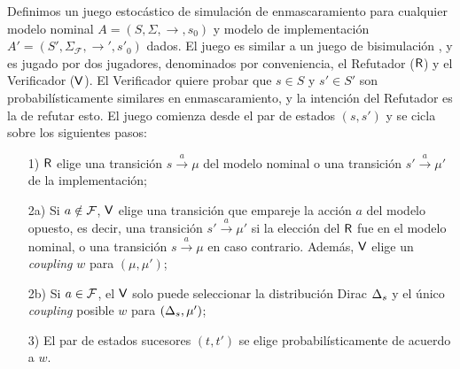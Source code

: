 Definimos un juego estocástico de simulación de enmascaramiento para cualquier modelo nominal
$A = ( S, \Sigma, {\rightarrow}, s_0 )$ y modelo de implementación $A' = ( S', \Sigma_{\mathcal{F}}, {\rightarrow'}, s'_0 )$ dados. 
El juego es similar a un juego de bisimulación \cite{Stirling98}, y es jugado por dos jugadores, 
denominados por conveniencia, el Refutador ($\mathsf{R}$) y el Verificador ($\mathsf{V}$). El Verificador quiere probar que $s \in S$ y $s' \in S'$ son probabilísticamente similares en enmascaramiento, 
y la intención del Refutador es la de refutar esto.
El juego comienza desde el par de estados $(s,s')$ y se cicla sobre los siguientes pasos:
\begin{enumerate}
\item[1)]
  $\mathsf{R}$ elige una transición $s \xrightarrow{a} \mu$ del modelo nominal o una transición $s' \xrightarrow{a} \mu'$ de la implementación;
\item[2a)]
  Si $a \notin \mathcal{F}$, $\mathsf{V}$ elige una transición que empareje la acción $a$ del modelo opuesto, es decir, una transición $s'
  \xrightarrow{a} \mu'$ si la elección del $\mathsf{R}$ fue en el modelo nominal,
  o una transición $s \xrightarrow{a} \mu$ en caso contrario.  Además,
  $\mathsf{V}$ elige un \textit{coupling} $w$ para $(\mu, \mu')$;
\item[2b)]
  Si $a \in \mathcal{F}$, el $\mathsf{V}$ solo puede seleccionar la distribución Dirac $\Delta_{s}$ y el único \textit{coupling} posible $w$ para
  $(\Delta_{s}, \mu')$;
\item[3)]
  El par de estados sucesores $(t, t')$ se elige probabilísticamente de acuerdo a $w$.
\end{enumerate}
%
